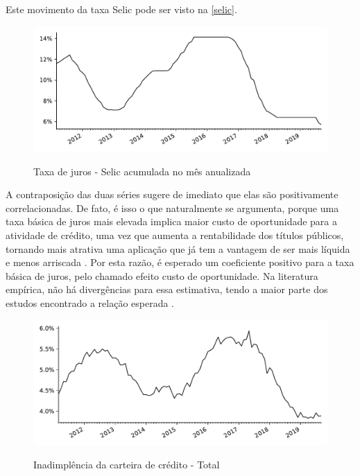 \documentclass[a4paper,
               article,
               12pt,
               openany,
               oneside,
               english,
               brazil]{abntex2}
\numberwithin{equation}{section}
\begin{document}
    Este movimento da taxa Selic pode ser visto na \autoref{selic}. 
    
    \begin{figure}[hbt]
        \centering
        \caption{Taxa de juros - Selic acumulada no mês anualizada}
        \includegraphics[width = \textwidth, scale=0.75]{selic.pdf}
        \label{selic}
    \end{figure}

    A contraposição das duas séries sugere de imediato que elas são positivamente correlacionadas. De fato, é isso o que naturalmente se argumenta, porque uma taxa básica de juros mais elevada implica maior custo de oportunidade para a atividade de crédito, uma vez que aumenta a rentabilidade dos títulos públicos, tornando mais atrativa uma aplicação que já tem a vantagem de ser mais líquida e menos arriscada \cite[p.~372]{oliveira2007}. Por esta razão, é esperado um coeficiente positivo para a taxa básica de juros, pelo chamado efeito custo de oportunidade. Na literatura empírica, não há divergências para essa estimativa, tendo a maior parte dos estudos encontrado a relação esperada \cite[p.~233-234]{leal07}.

    \begin{figure}[b]
        \centering
        \caption{Inadimplência da carteira de crédito - Total}
        \includegraphics[width = \textwidth, scale=0.75]{inad.pdf}
        \label{inad}
    \end{figure}
\end{document}
